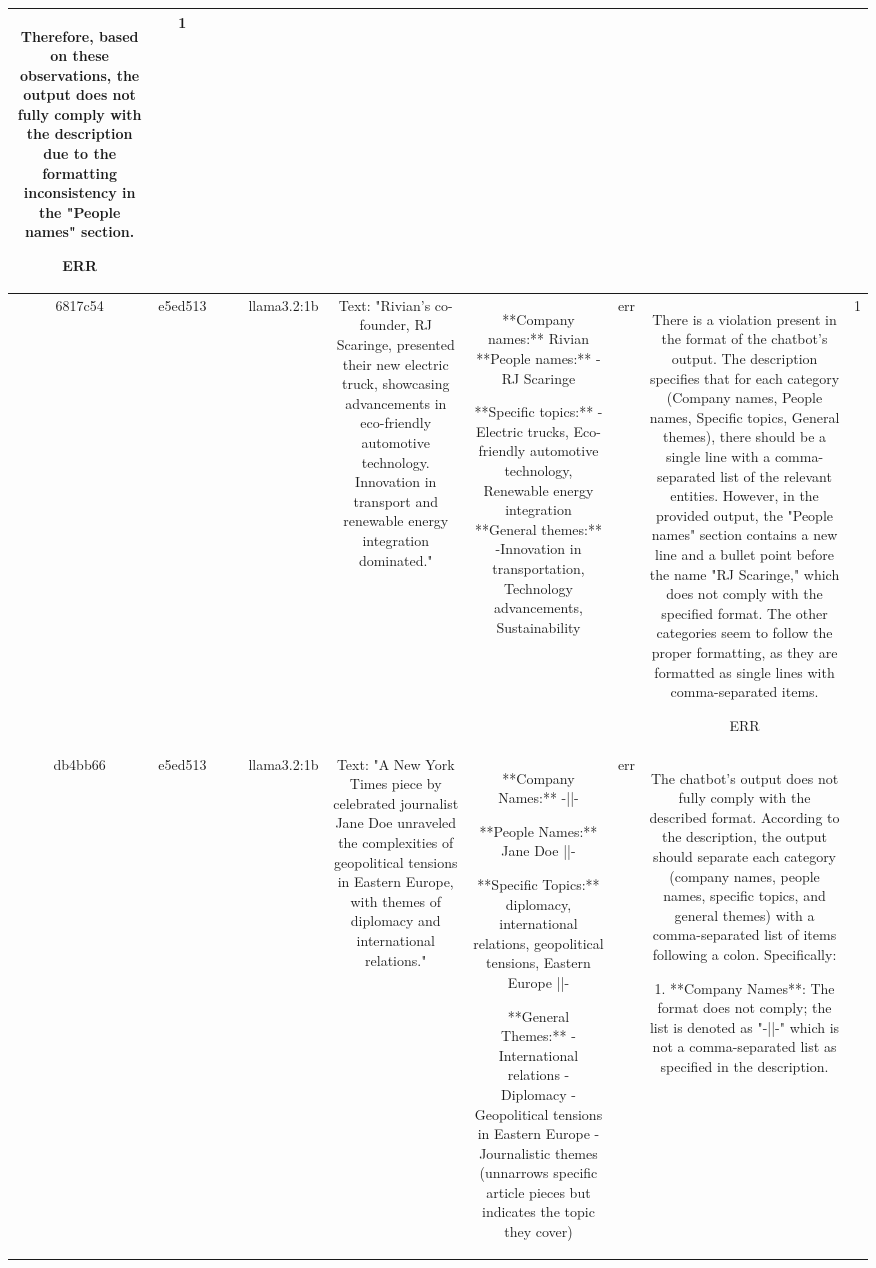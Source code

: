 \begin{table}[h!]
\begin{tabular}{|c|c|c|c|c|c|c|c|c|c|}
Therefore, based on these observations, the output does not fully comply with the description due to the formatting inconsistency in the "People names" section.

ERR & 1\\
\hline
6817c54 & e5ed513 &  &  & llama3.2:1b & Text: "Rivian's co-founder, RJ Scaringe, presented their new electric truck, showcasing advancements in eco-friendly automotive technology. Innovation in transport and renewable energy integration dominated." & **Company names:** Rivian
**People names:** 
- RJ Scaringe

**Specific topics:** -Electric trucks, Eco-friendly automotive technology, Renewable energy integration
**General themes:** -Innovation in transportation, Technology advancements, Sustainability & err & There is a violation present in the format of the chatbot's output. The description specifies that for each category (Company names, People names, Specific topics, General themes), there should be a single line with a comma-separated list of the relevant entities. However, in the provided output, the "People names" section contains a new line and a bullet point before the name "RJ Scaringe," which does not comply with the specified format. The other categories seem to follow the proper formatting, as they are formatted as single lines with comma-separated items.

ERR & 1\\
\hline
db4bb66 & e5ed513 &  &  & llama3.2:1b & Text: "A New York Times piece by celebrated journalist Jane Doe unraveled the complexities of geopolitical tensions in Eastern Europe, with themes of diplomacy and international relations." & **Company Names:** -||-

**People Names:** Jane Doe ||-

**Specific Topics:** diplomacy, international relations, geopolitical tensions, Eastern Europe ||-

**General Themes:** 
- International relations
- Diplomacy
- Geopolitical tensions in Eastern Europe
- Journalistic themes (unnarrows specific article pieces but indicates the topic they cover) & err & The chatbot's output does not fully comply with the described format. According to the description, the output should separate each category (company names, people names, specific topics, and general themes) with a comma-separated list of items following a colon. Specifically:

1. **Company Names**: The format does not comply; the list is denoted as "-||-" which is not a comma-separated list as specified in the description.
   

\end{tabular}
\end{table}
